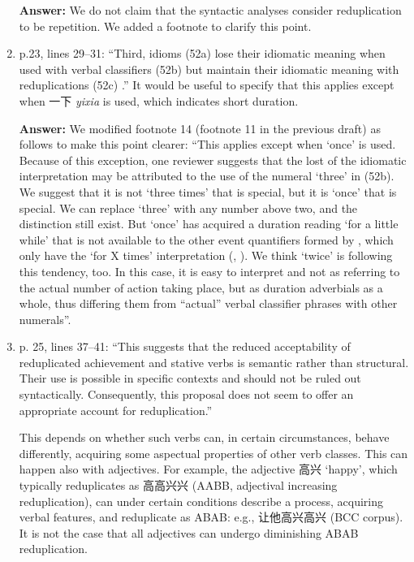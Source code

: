 \documentclass[fleqn,twoside]{article}
\begin{document}
\begin{enumerate}
\noindent
\textbf{Answer:} We do not claim that the syntactic analyses consider reduplication to be repetition. We added a footnote to clarify this point.


\item p.23, lines 29--31: ``Third, idioms (52a) lose their idiomatic meaning when used with verbal classifiers
(52b) but maintain their idiomatic meaning with reduplications (52c) \citep[230--231]{YangWei2017}.''
It would be useful to specify that this applies except when 一下 \textit{yixia} is used, which indicates short
duration.

\noindent
\textbf{Answer:} We modified footnote 14 (footnote 11 in the previous draft) as follows to make this point clearer: ``This applies except when  `once' is used. Because of this exception, one reviewer suggests that the lost of the idiomatic interpretation may be attributed to the use of the numeral  `three' in (52b). We suggest that it is not   `three times' that is special, 
but it is   `once' that is special.
We can replace  `three' with any number above two,
and the distinction still exist.
But   `once' has acquired a duration reading `for a little while' that is not available to the other event quantifiers formed by , which only have the `for X times' interpretation (\citealt[77]{Deng2013}, \citealt[16]{Zhang2000}).
We think   `twice' is following this tendency, too.
In this case, it is easy to interpret   and   not as referring to the actual number of action taking place,
but as duration adverbials as a whole,
thus differing them from ``actual'' verbal classifier phrases with other numerals''.


\item p. 25, lines 37--41: ``This suggests that the reduced acceptability of reduplicated achievement and
stative verbs is semantic rather than structural. Their use is possible in specific contexts and should
not be ruled out syntactically. Consequently, this proposal does not seem to offer an appropriate
account for reduplication.''

This depends on whether such verbs can, in certain circumstances, behave differently, acquiring some
aspectual properties of other verb classes. This can happen also with adjectives. For example, the
adjective 高兴 `happy', which typically reduplicates as 高高兴兴 (AABB, adjectival increasing
reduplication), can under certain conditions describe a process, acquiring verbal features, and
reduplicate as ABAB: e.g., 让他高兴高兴 (BCC corpus). It is not the case that all adjectives can
undergo diminishing ABAB reduplication.


\end{enumerate}
\end{document}
